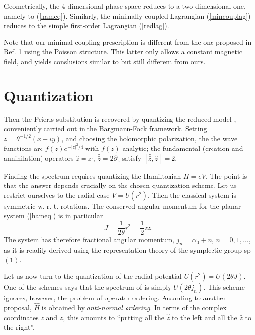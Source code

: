 \documentclass[a4paper,12pt]{article}
\newcommand\half{{\scriptstyle{\frac{1}{2}}}}
\begin{document}
Geometrically, the $4$-dimensional phase space reduces to a 
two-dimensional one, namely to (\ref{hameq}).
Similarly, the minimally coupled Lagrangian (\ref{mincouplag})
reduces to the simple first-order Lagrangian (\ref{redlag}).

Note that our 
minimal coupling prescription is different from the one proposed
in Ref. 1 using the Poisson structure. 
This latter only allows a
constant magnetic field, and yields  conslusions
similar to but still different from ours.

\section{Quantization}

Then the Peierls substitution is recovered
by quantizing the reduced model \cite{DJT,DH},
 conveniently carried out in the Bargmann-Fock
framework. Setting $z=\theta^{-1/2}(x+iy)$, and
choosing the holomorphic polarization, the
the wave functions are $f(z)e^{-\vert z\vert^2/4}$ with $f(z)$
analytic; the fundamental (creation and annihilation) operators 
$ 
\widehat{z}=z\cdot,
\, 
\widehat{\bar{z}}=2\partial_{z}
$ 
satisfy $[\widehat{\bar{z}},\widehat{z}]=2$.

Finding the spectrum requires quantizing  the Hamiltonian
 $H=eV$. 
The point is that  the answer depends crucially on the chosen
quantization scheme.
Let us restrict ourselves to the radial case $V=U(r^2)$.
Then the classical system is symmetric w. r. t. rotations.
The conserved angular momentum for the planar system
(\ref{hameq}) is in particular
\begin{equation}
J=\frac{1}{2\theta} r^2=\half z\bar{z}.
\label{angmom}
\end{equation}
The system has therefore fractional angular momentum,   
$j_{n}=\alpha_{0}+n,\, n=0, 1,\dots$, as it is readily derived\cite{HMC}
using the representation theory of the symplectic group sp$(1)$.


Let us now turn to the quantization of the radial potential 
$U(r^2)=U(2\theta J)$.
One of the schemes\cite{NC2,HMC} says that the spectrum of is simply
$ 
U(2\theta j_{n}).
$ 
This scheme ignores, however, the problem of operator ordering.
According to another proposal\cite{GJ,DJT}, $\widehat{H}$ is obtained
by {\it anti-normal ordering}. In terms of the complex coordinates 
$z$ and $\bar{z}$, this amounts to ``putting all the
$\widehat{\bar{z}}$ to the left and all the $\widehat{z}$ to the right''.
\end{document}
